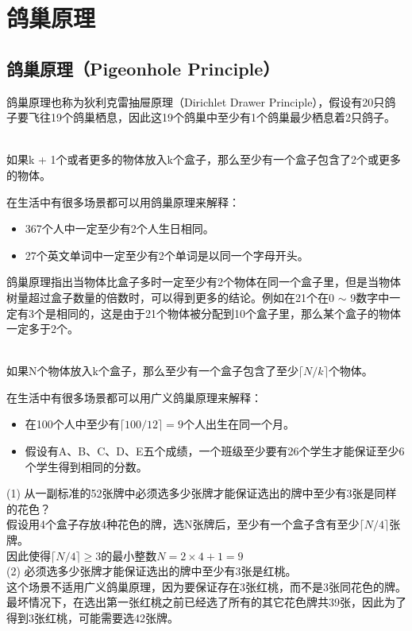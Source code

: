 \newpage

\section{鸽巢原理}

\subsection{鸽巢原理（Pigeonhole Principle）}

鸽巢原理也称为狄利克雷抽屉原理（Dirichlet Drawer Principle），假设有20只鸽子要飞往19个鸽巢栖息，因此这19个鸽巢中至少有1个鸽巢最少栖息着2只鸽子。

\begin{tcolorbox}
	\\
	如果k + 1个或者更多的物体放入k个盒子，那么至少有一个盒子包含了2个或更多的物体。
\end{tcolorbox}

在生活中有很多场景都可以用鸽巢原理来解释：

\begin{itemize}
	\item 367个人中一定至少有2个人生日相同。
	\item 27个英文单词中一定至少有2个单词是以同一个字母开头。
\end{itemize}

鸽巢原理指出当物体比盒子多时一定至少有2个物体在同一个盒子里，但是当物体树量超过盒子数量的倍数时，可以得到更多的结论。例如在21个在0 $ \sim $ 9数字中一定有3个是相同的，这是由于21个物体被分配到10个盒子里，那么某个盒子的物体一定多于2个。

\begin{tcolorbox}
	\\
	如果N个物体放入k个盒子，那么至少有一个盒子包含了至少$ \lceil N / k \rceil $个物体。
\end{tcolorbox}

在生活中有很多场景都可以用广义鸽巢原理来解释：

\begin{itemize}
	\item 在100个人中至少有$ \lceil 100 / 12 \rceil = 9 $个人出生在同一个月。
	\item 假设有A、B、C、D、E五个成绩，一个班级至少要有26个学生才能保证至少6个学生得到相同的分数。
\end{itemize}

\begin{tcolorbox}
	(1) 从一副标准的52张牌中必须选多少张牌才能保证选出的牌中至少有3张是同样的花色？\\
	假设用4个盒子存放4种花色的牌，选N张牌后，至少有一个盒子含有至少$ \lceil N / 4 \rceil $张牌。\\
	因此使得$ \lceil N / 4 \rceil \ge 3 $的最小整数$ N = 2 \times 4 + 1 = 9 $\\

	(2) 必须选多少张牌才能保证选出的牌中至少有3张是红桃。\\
	这个场景不适用广义鸽巢原理，因为要保证存在3张红桃，而不是3张同花色的牌。\\
	最坏情况下，在选出第一张红桃之前已经选了所有的其它花色牌共39张，因此为了得到3张红桃，可能需要选42张牌。
\end{tcolorbox}

